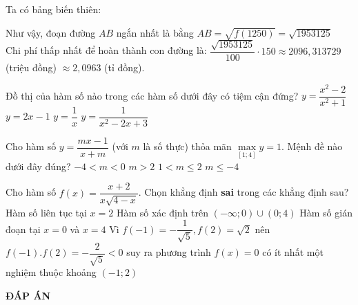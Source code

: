 \begin{ex}
{Ta có bảng biến thiên:
\begin{center}
\end{center}
Như vậy, đoạn đường $AB$ ngắn nhất là bằng $AB=\sqrt{f\left(1250\right)}=\sqrt{1953125} $\\
Chi phí thấp nhất để hoàn thành con đường là: $\dfrac{\sqrt{1953125}}{100}\cdot 150 \approx 2096,313729 $ (triệu đồng) $\approx 2,0963$ (tỉ đồng).
}
\end{ex}

\begin{ex}%
Đồ thị của hàm số nào trong các hàm số dưới đây có tiệm cận đứng?
\choice
{$y=\dfrac{x^2-2}{x^2+1}$}
{$y=2x-1$}
{\True $y=\dfrac{1}{x}$}
{$y=\dfrac{1}{x^2-2x+3}$}
\loigiai{}
\end{ex}

\begin{ex}%
Cho hàm số $y=\dfrac{mx-1}{x+m}$ (với $m$ là số thực) thỏa mãn $\mathop{\max}\limits_{[1;4]}y=1$. Mệnh đề nào dưới đây đúng?
\choice
{$-4<m<0$}
{$m>2$}
{\True $1<m \leq 2$}
{$m \leq -4$}
\end{ex}

\begin{ex}%
Cho hàm số $f(x)=\dfrac{x+2}{x\sqrt{4-x}}$. Chọn khẳng định {\bf sai} trong các khẳng định sau? 
\choice
{Hàm số liên tục tại $x=2$}
{Hàm số xác định trên $(-\infty;0) \cup (0;4)$}
{Hàm số gián đoạn tại $x=0$ và $x=4$}
{\True Vì $f(-1)=-\dfrac{1}{\sqrt{5}},f(2)=\sqrt{2}$ nên $f(-1).f(2)=-\dfrac{2}{\sqrt{5}}<0$ suy ra phương trình $f(x)=0$ có ít nhất một nghiệm thuộc khoảng $(-1;2)$}
\end{ex}

\newpage
\begin{center}
	\textbf{ĐÁP ÁN}
\end{center}
\begin{multicols}{10}
	 
\end{multicols}
